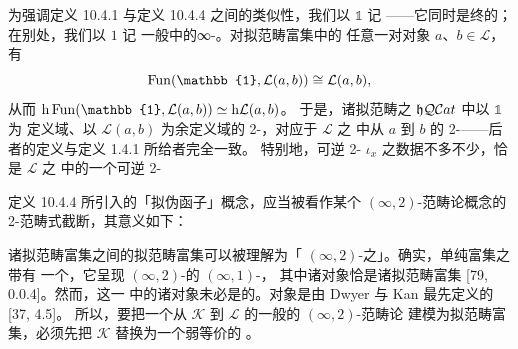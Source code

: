 \begin{remark}\label{rem:terminal-qcat-notation}
为强调定义 10.4.1 与定义 10.4.4 之间的类似性，我们以 $\mathbb{1}$ 记%
\trTerminal{}\trQuasiCategory——它同时是终\trCategory{}的\trNerve；在别处，我们以 $1$ 记
一般\trInfinityCosmos{}中的\trTerminal{}∞-\trCategory。对拟范畴富集\trCategory{}中的
任意一对对象 $a$、$b\in\mathcal{L}$，有
\begin{equation*}
\Fun(\mathbb{1},\mathcal{L}(a,b))\cong\mathcal{L}(a,b),
\end{equation*}
从而 $\mathrm{h}\Fun(\mathbb{1},\mathcal{L}(a,b))\simeq\mathrm{h}\mathcal{L}(a,b)$。
于是，诸拟范畴之\trHomotopyTwoCategory{} $\mathfrak{h}\mathcal{Q}\mathcal{C}at$ 中以 $\mathbb{1}$ 为
定义域、以 $\mathcal{L}(a,b)$ 为余定义域的 2-\trCell{}，对应于 $\mathcal{L}$ 之%
\trHomotopyTwoCategory{}中从 $a$ 到 $b$ 的 2-\trCell{}——后者的定义与定义 1.4.1
所给者完全一致。
特别地，可逆 2-\trCell{} $\iota_{x}$ 之数据不多不少，恰是 $\mathcal{L}$ 之%
\trHomotopyTwoCategory{}中的一个可逆 2-\trCell
\begin{center}
\end{center}
\end{remark}

定义 10.4.4 所引入的「拟伪函子」概念，应当被看作某个 $(\infty,2)$-范畴论概念的
2-范畴式截断，其意义如下：

\begin{digression}\label{dig:quasi-pseudofunctor-infinity-2-functor}
诸拟范畴富集\trCategory{}之间的拟范畴富集\trFunctor{}可以被理解为「%
$(\infty,2)$-\trCategory{}之\trFunctor」。确实，单纯富集\trCategory{}之\trCategory{}带有
一个\trModelStructure，它呈现 $(\infty,2)$-\trCategory{}的 $(\infty,1)$-\trCategory，
其中诸\trFibrant{}对象恰是诸拟范畴富集\trCategory{} [79, 0.0.4]。然而，这一%
\trCategory{}中的诸\trFibrant{}对象未必是\trCofibrant{}的。\trCofibrant{}对象是由
Dwyer 与 Kan 最先定义的\trSimplicialComputad{} [37, 4.5]。
所以，要把一个从 $\mathcal{K}$ 到 $\mathcal{L}$ 的一般的 $(\infty,2)$-范畴论%
\trFunctor{}建模为拟范畴富集\trFunctor，必须先把 $\mathcal{K}$ 替换为一个弱等价的%
\trSimplicialComputad。
\end{digression}

